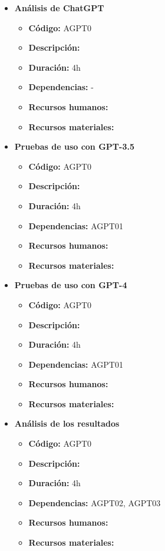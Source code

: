 \begin{itemize}
    \item \textbf{Análisis de ChatGPT}
        \begin{itemize}
            \item \textbf{Código:} AGPT0
            \item \textbf{Descripción:}
            \item \textbf{Duración:} 4h
            \item \textbf{Dependencias:} -
            \item \textbf{Recursos humanos:}
            \item \textbf{Recursos materiales:}
        \end{itemize}
    \item \textbf{Pruebas de uso con GPT-3.5}
        \begin{itemize}
            \item \textbf{Código:} AGPT0
            \item \textbf{Descripción:}
            \item \textbf{Duración:} 4h
            \item \textbf{Dependencias:} AGPT01
            \item \textbf{Recursos humanos:}
            \item \textbf{Recursos materiales:}
        \end{itemize}
    \item \textbf{Pruebas de uso con GPT-4}
        \begin{itemize}
            \item \textbf{Código:} AGPT0
            \item \textbf{Descripción:}
            \item \textbf{Duración:} 4h
            \item \textbf{Dependencias:} AGPT01
            \item \textbf{Recursos humanos:}
            \item \textbf{Recursos materiales:}
        \end{itemize}
    \item \textbf{Análisis de los resultados}
        \begin{itemize}
            \item \textbf{Código:} AGPT0
            \item \textbf{Descripción:}
            \item \textbf{Duración:} 4h
            \item \textbf{Dependencias:} AGPT02, AGPT03
            \item \textbf{Recursos humanos:}
            \item \textbf{Recursos materiales:}
        \end{itemize}
\end{itemize}

